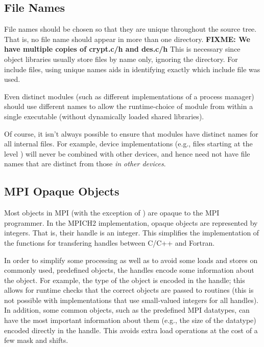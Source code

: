 \documentclass{article}
\def\fixme#1{\marginpar{FIXME:}\textbf{FIXME: #1}}
\begin{document}
\subsection{File Names}
\label{sec:mpi-src-filenames}
File names should be chosen so that they are unique throughout the source
tree.  That is, no file name should appear in more than one directory.  
\fixme{We have multiple copies of crypt.c/h and des.c/h}
This
is necessary since object libraries usually store files by name only, ignoring
the directory.  For include files, using unique names aids in identifying
exactly which include file was used.

Even distinct modules (such as different implementations of a process
manager) should use different names to allow the runtime-choice of
module from within a single executable (without dynamically loaded
shared libraries).

Of course, it isn't always possible to ensure that modules have
distinct names for all internal files.  For example, device
implementations (e.g., files starting at the level
) will never be combined with other
devices, and hence need not have file names that are distinct from
those \emph{in other devices}.  

\subsection{MPI Opaque Objects}
\label{sec:mpi-opaque}
Most objects in MPI (with the exception of ) are
opaque to the MPI programmer.  In the MPICH2 implementation, opaque
objects are represented 
by integers.  That is, their handle is an integer.
This simplifies the implementation of the functions for
transfering handles between C/C++ and Fortran.  

In order to simplify some processing as well as to avoid some loads
and stores on commonly used, predefined objects, the handles encode
some information about the object.  For example, the type of the
object is encoded in the handle; this allows for runtime checks that
the correct objects are passed to routines (this is not possible with
implementations that use small-valued integers for all handles).  In
addition, some common objects, such as the predefined MPI datatypes,
can have the most important information about them (e.g., the size of
the datatype) encoded directly in the handle.  This avoids extra load
operations at the cost of a few mask and shifts. 
\end{document}
